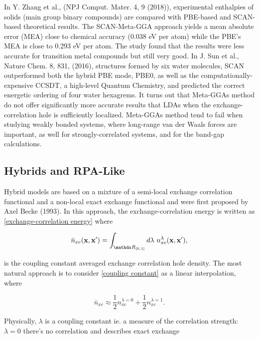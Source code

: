 \documentclass{homework}
\begin{document}
In Y. Zhang et al., (NPJ Comput. Mater. 4, 9 (2018)), experimental enthalpies of solids (main group binary compounds) are compared with PBE-based and SCAN-based theoretical results. The SCAN-Meta-GGA approach yields a mean absolute error (MEA) close to chemical accuracy (0.038 eV per atom) while the PBE's MEA is close to 0.293 eV per atom. The study found that the results were less accurate for transition metal compounds but still very good. In J. Sun et al., Nature Chem. 8, 831, (2016), structures formed by six water molecules, SCAN outperformed both the hybrid PBE mode, PBE0, as well as the computationally-expensive CCSDT, a high-level Quantum Chemistry, and predicted the correct energetic ordering of four water hexagrems. It turns out that Meta-GGAs method do not offer significantly more accurate results that LDAs when the exchange-correlation hole is sufficiently localized. Meta-GGAs method tend to fail when studying weakly bonded systems, where long-range van der Waals forces are important, as well for strongly-correlated systems, and for the band-gap calculations. \\

\subsection{Hybrids and RPA-Like}

Hybrid models are based on a mixture of a semi-local exchange correlation functional and a non-local exact exchange functional and were first proposed by Axel Becke (1993). In this approach, the exchange-correlation energy is written as \eqref{exchange-correlation energy} where 

\begin{equation}
    \bar{n}_{xc}(\x, \x') = \int_{\R_{[0,1]}} d\lambda \blanky n_{xc}^\lambda(\x, \x'), 
    \label{coupling constant}
\end{equation}

is the coupling constant averaged exchange correlation hole density. The most natural approach is to consider \eqref{coupling constant} as a linear interpolation, where

\begin{equation}
    \bar{n}_{xc} \approx \frac{1}{2} n_{xc}^{\lambda = 0} + \frac{1}{2} n_{xc}^{\lambda = 1}.
\end{equation}

Physically, $\lambda$ is a coupling constant ie. a measure of the correlation strength: $\lambda = 0$ there's no correlation and describes exact exchange
\end{document}

